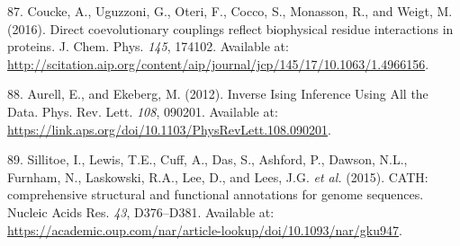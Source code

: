 \documentclass[12pt,a4paper,twoside]{book}
\theoremstyle{definition}
\theoremstyle{definition}
\theoremstyle{remark}
\begin{document}
\hypertarget{ref-Coucke2016}{}
87. Coucke, A., Uguzzoni, G., Oteri, F., Cocco, S., Monasson, R., and
Weigt, M. (2016). Direct coevolutionary couplings reflect biophysical
residue interactions in proteins. J. Chem. Phys. \emph{145}, 174102.
Available at:
\url{http://scitation.aip.org/content/aip/journal/jcp/145/17/10.1063/1.4966156}.

\hypertarget{ref-Aurell2012}{}
88. Aurell, E., and Ekeberg, M. (2012). Inverse Ising Inference Using
All the Data. Phys. Rev. Lett. \emph{108}, 090201. Available at:
\url{https://link.aps.org/doi/10.1103/PhysRevLett.108.090201}.

\hypertarget{ref-Sillitoe2015}{}
89. Sillitoe, I., Lewis, T.E., Cuff, A., Das, S., Ashford, P., Dawson,
N.L., Furnham, N., Laskowski, R.A., Lee, D., and Lees, J.G. \emph{et
al.} (2015). CATH: comprehensive structural and functional annotations
for genome sequences. Nucleic Acids Res. \emph{43}, D376--D381.
Available at:
\url{https://academic.oup.com/nar/article-lookup/doi/10.1093/nar/gku947}.
\end{document}
